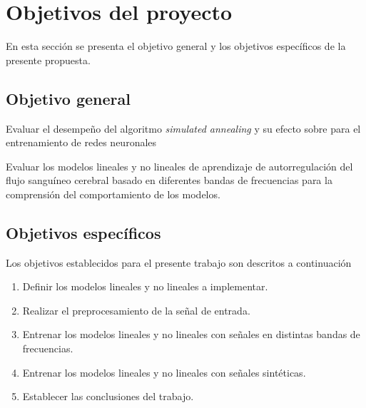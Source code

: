 \section{Objetivos del proyecto}
En esta sección se presenta el objetivo general y los objetivos específicos de la presente propuesta.

\subsection{Objetivo general}
Evaluar el desempeño del algoritmo {\em simulated annealing} y su efecto sobre para el entrenamiento de redes neuronales 

Evaluar los modelos lineales y no lineales de aprendizaje de autorregulación del flujo sanguíneo cerebral basado en diferentes bandas de frecuencias para la comprensión del comportamiento de los modelos.

\subsection{Objetivos específicos}
Los objetivos establecidos para el presente trabajo son descritos a continuación
\begin{enumerate}
    \item Definir los modelos lineales y no lineales a implementar.
    \item Realizar el preprocesamiento de la señal de entrada.
    \item Entrenar los modelos lineales y no lineales con señales en distintas bandas de frecuencias.
    \item Entrenar los modelos lineales y no lineales con señales sintéticas.
    \item Establecer las conclusiones del trabajo.
\end{enumerate}
